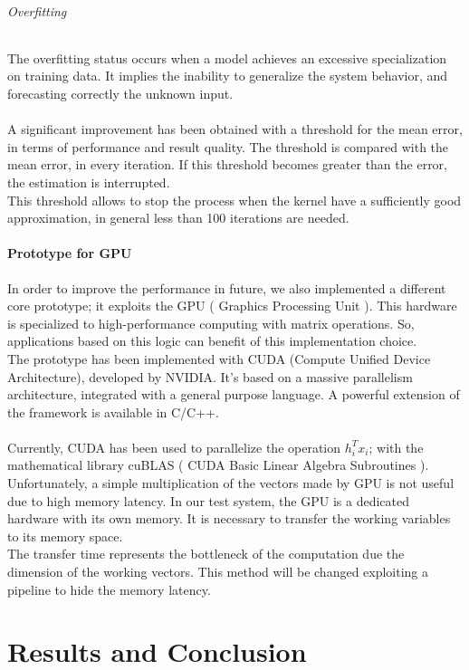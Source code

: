 \paragraph{Overfitting} The overfitting status occurs when a model achieves an excessive specialization on training data. It implies the inability to generalize the system behavior, and forecasting correctly the unknown input.\\\\
A significant improvement has been obtained with a threshold for the mean error, in terms of performance and result quality. The threshold is compared with the mean error, in every iteration. If this threshold becomes greater than the error, the estimation is interrupted.\\
This threshold allows to stop the process when the kernel have a sufficiently good approximation, in general less than 100 iterations are needed.
\subsection{Prototype for GPU}
In order to improve the performance in future, we also implemented a different core prototype; it exploits the GPU ( Graphics Processing Unit ). This hardware is specialized to high-performance computing with matrix operations. So, applications based on this logic can benefit of this implementation choice.\\
The prototype has been implemented with CUDA (Compute Unified Device Architecture), developed by NVIDIA. It's based on a massive parallelism architecture, integrated with a general purpose language. A powerful extension of the framework is available in C/C++.\\\\
Currently, CUDA has been used to parallelize the operation $h_i^T x_i$; with the mathematical library cuBLAS ( CUDA Basic Linear Algebra Subroutines ).\\
Unfortunately, a simple multiplication of the vectors made by GPU is not useful due to high memory latency. In our test system, the GPU is a dedicated hardware with its own memory. It is necessary to transfer the working variables to its memory space.\\
The transfer time represents the bottleneck of the computation due the dimension of the working vectors. This method will be changed exploiting a pipeline to hide the memory latency.


\part{Results and Conclusion}
